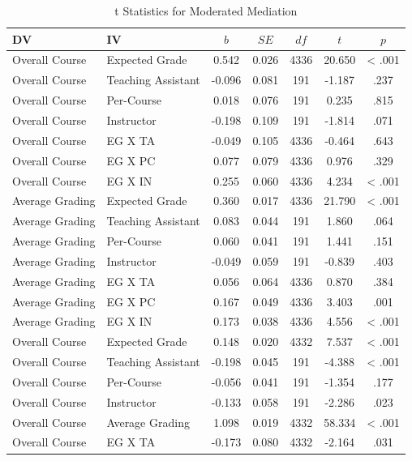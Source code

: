\documentclass[,man]{apa6}
\theoremstyle{definition}
\theoremstyle{definition}
\theoremstyle{definition}
\theoremstyle{remark}
\begin{document}
\begin{table}[tbp]
\begin{center}
\begin{threeparttable}
\caption{\label{tab:table-mod-med}t Statistics for Moderated Mediation}
\small{
\begin{tabular}{llccccc}
\toprule
DV & IV & $b$ & $SE$ & $df$ & $t$ & $p$\\
\midrule
Overall Course & Expected Grade & 0.542 & 0.026 & 4336 & 20.650 & < .001\\
Overall Course & Teaching Assistant & -0.096 & 0.081 & 191 & -1.187 & .237\\
Overall Course & Per-Course & 0.018 & 0.076 & 191 & 0.235 & .815\\
Overall Course & Instructor & -0.198 & 0.109 & 191 & -1.814 & .071\\
Overall Course & EG X TA & -0.049 & 0.105 & 4336 & -0.464 & .643\\
Overall Course & EG X PC & 0.077 & 0.079 & 4336 & 0.976 & .329\\
Overall Course & EG X IN & 0.255 & 0.060 & 4336 & 4.234 & < .001\\
Average Grading & Expected Grade & 0.360 & 0.017 & 4336 & 21.790 & < .001\\
Average Grading & Teaching Assistant & 0.083 & 0.044 & 191 & 1.860 & .064\\
Average Grading & Per-Course & 0.060 & 0.041 & 191 & 1.441 & .151\\
Average Grading & Instructor & -0.049 & 0.059 & 191 & -0.839 & .403\\
Average Grading & EG X TA & 0.056 & 0.064 & 4336 & 0.870 & .384\\
Average Grading & EG X PC & 0.167 & 0.049 & 4336 & 3.403 & .001\\
Average Grading & EG X IN & 0.173 & 0.038 & 4336 & 4.556 & < .001\\
Overall Course & Expected Grade & 0.148 & 0.020 & 4332 & 7.537 & < .001\\
Overall Course & Teaching Assistant & -0.198 & 0.045 & 191 & -4.388 & < .001\\
Overall Course & Per-Course & -0.056 & 0.041 & 191 & -1.354 & .177\\
Overall Course & Instructor & -0.133 & 0.058 & 191 & -2.286 & .023\\
Overall Course & Average Grading & 1.098 & 0.019 & 4332 & 58.334 & < .001\\
Overall Course & EG X TA & -0.173 & 0.080 & 4332 & -2.164 & .031\\

\end{tabular}}
\end{threeparttable}
\end{center}
\end{table}
\end{document}
